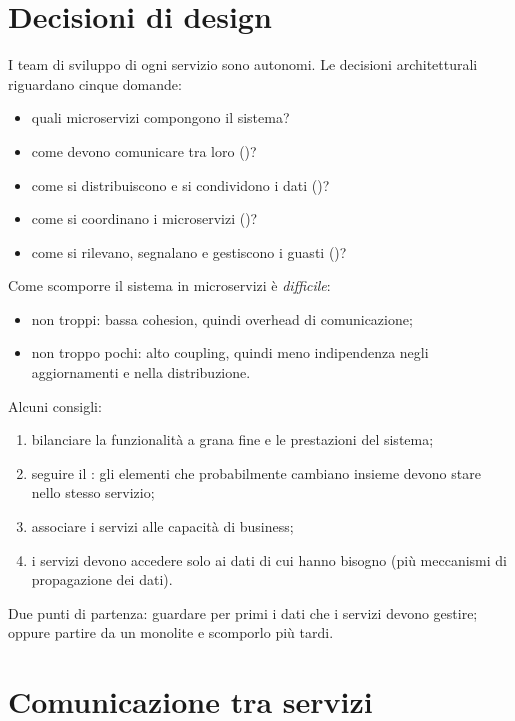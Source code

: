 \section{Decisioni di design}
\label{sec:micro-design}

I team di sviluppo di ogni servizio sono autonomi. Le decisioni architetturali riguardano cinque domande:
\begin{itemize}
  \item quali microservizi compongono il sistema?
  \item come devono comunicare tra loro ()?
  \item come si distribuiscono e si condividono i dati ()?
  \item come si coordinano i microservizi ()?
  \item come si rilevano, segnalano e gestiscono i guasti ()?
\end{itemize}

Come scomporre il sistema in microservizi è \emph{difficile}:
\begin{itemize}
  \item non troppi: bassa cohesion, quindi overhead di comunicazione;
  \item non troppo pochi: alto coupling, quindi meno indipendenza negli aggiornamenti e nella distribuzione.
\end{itemize}

Alcuni consigli:
\begin{enumerate}
  \item bilanciare la funzionalità a grana fine e le prestazioni del sistema;
  \item seguire il : gli elementi che probabilmente cambiano insieme devono stare
    nello stesso servizio;
  \item associare i servizi alle capacità di business;
  \item i servizi devono accedere solo ai dati di cui hanno bisogno (più meccanismi di propagazione dei dati).
\end{enumerate}
Due punti di partenza: guardare per primi i dati che i servizi devono gestire; oppure partire da un monolite e
scomporlo più tardi.

\section{Comunicazione tra servizi}
\label{sec:micro-comunicazione}

